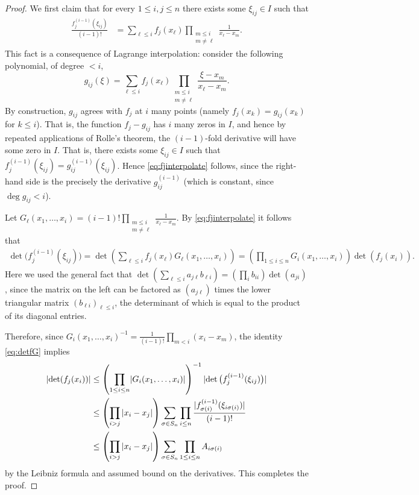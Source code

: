 \documentclass[12pt]{amsart}
\newcommand{\1}{{\mathbf 1}}
\theoremstyle{remark}
\theoremstyle{definition}
\begin{document}
\begin{proof}
We first claim that for every $1\leq i,j\leq n$ there exists some $\xi_{ij}\in I$ such that
\begin{align}\label{eq:fjinterpolate}
\frac{f_j^{(i-1)}(\xi_{ij})}{(i-1)!}
&=\sum_{\ell\leq i} f_j(x_\ell) \prod_{\substack{m\leq i\\ m\neq \ell}}\frac{1}{x_\ell-x_m}. %
\end{align}
This fact is a consequence of Lagrange interpolation: consider the following polynomial, of degree $<i$, 
\[g_{ij}(\xi) = \sum_{\ell\leq i}f_j(x_\ell) \prod_{\substack{m\leq i\\ m\neq \ell}}\frac{\xi-x_m}{x_\ell-x_m}.\]
By construction, $g_{ij}$ agrees with $f_j$ at $i$ many points (namely $f_j(x_k)=g_{ij}(x_k)$ for $k\leq i$). That is, the function $f_{j}-g_{ij}$ has $i$ many zeros in $I$, and hence by repeated applications of Rolle's theorem, the $(i-1)$-fold derivative will have some zero in $I$. That is, there exists some $\xi_{ij}\in I$ such that $f_j^{(i-1)}(\xi_{ij}) = g_{ij}^{(i-1)}(\xi_{ij})$. Hence \eqref{eq:fjinterpolate} follows, since the right-hand side is the precisely the derivative $g_{ij}^{(i-1)}$ (which is constant, since $\deg g_{ij}<i$).

Let $G_{\ell}(x_1,\ldots,x_i)=(i-1)!\prod_{\substack{m\leq i\\ m\neq \ell}}\frac{1}{x_\ell-x_m}$. By \eqref{eq:fjinterpolate} it follows that
\begin{align}\label{eq:detfG}
\det\big(f_j^{(i-1)}(\xi_{ij})\big)
=\det\left(\sum_{\ell\leq i}f_j(x_\ell)G_\ell(x_1,\ldots,x_i)\right)=\left(\prod_{1\leq i\leq n}G_{i}(x_1,\ldots,x_i)\right)\det(f_j(x_i)).
\end{align}
Here we used the general fact that $\det( \sum_{\ell \leq i}a_{j\ell}b_{\ell i})=\left(\prod_{i}b_{ii}\right)\det(a_{ji})$, since the matrix on the left can be factored as $(a_{j\ell})$ times the lower triangular matrix $(b_{\ell i})_{\ell\leq i}$, the determinant of which is equal to the product of its diagonal entries. 

Therefore, since $G_{i}(x_1,\ldots,x_i)^{-1}=\frac{1}{(i-1)!}\prod_{m<i}(x_i-x_m)$, the identity \eqref{eq:detfG} implies
\begin{align*}
\left\lvert\det(f_j(x_i))\right\rvert
& \le \left(\prod_{1\leq i\leq n}\lvert G_{i}(x_1,\ldots,x_i)\rvert\right)^{-1} \lvert\det\big(f_j^{(i-1)}(\xi_{ij})\big)\rvert\\
&\le \left(\prod_{i>j}\abs{x_i-x_j}\right)\sum_{\sigma\in S_n}\prod_{i\le n}\frac{\lvert f^{(i-1)}_{\sigma(i)}(\xi_{i\sigma(i)})\rvert}{(i-1)!} \\
& \le  \left(\prod_{i> j}\abs{x_i-x_j}\right)\sum_{\sigma \in S_n}\prod_{1\leq i\leq n}A_{i\sigma(i)}
\end{align*}
by the Leibniz formula and assumed bound on the derivatives. This completes the proof.
\end{proof}
\end{document}
